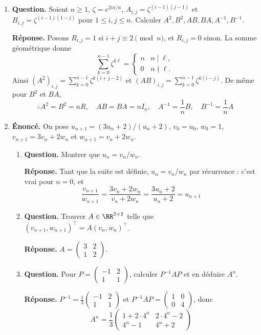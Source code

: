 \documentclass[12pt, a4paper]{article}
\begin{document}
\begin{enumerate}[label=4.\arabic*., start=60]
  \item \begin{minipage}[t]{\linewidth}\raggedright
\textbf{Question.} Soient $n\geq1$, $\zeta=e^{2i\pi/n}$, $A_{i,j}=\zeta^{(i-1)(j-1)}$ et $B_{i,j}=\zeta^{(i-1)(1-j)}$ pour $1\leq i,j\leq n$. Calculer $A^2,B^2,AB,BA,A^{-1},B^{-1}$.
\par\smallskip
\textbf{Réponse.} Posons $R_{i,j}=1$ si $i+j\equiv2\pmod n$, et $R_{i,j}=0$ sinon.
    La somme géométrique donne
    \[
      \sum_{k=0}^{n-1}\zeta^{k\ell}=\begin{cases}n&n\mid\ell,\\0&n\nmid\ell.\end{cases}
    \]
    Ainsi $(A^2)_{i,j}=\sum_{k=0}^{n-1}\zeta^{k(i+j-2)}$ et
    $(AB)_{i,j}=\sum_{k=0}^{n-1}\zeta^{k(i-j)}$.
    De même pour $B^2$ et $BA$,
    \[
      \therefore A^2=B^2=nR,\quad AB=BA=nI_n,\quad A^{-1}=\frac1nB,\quad B^{-1}=\frac1nA
    \]
\end{minipage}

  \item \begin{minipage}[t]{\linewidth}\raggedright
\textbf{Énoncé.} On pose $u_{n+1}=(3u_n+2)/(u_n+2)$, $v_0=u_0$, $w_0=1$, $v_{n+1}=3v_n+2w_n$ et $w_{n+1}=v_n+2w_n$.

\begin{enumerate}[\arabic*.]
        \item \textbf{Question.} Montrer que $u_n=v_n/w_n$.
\par\smallskip
\textbf{Réponse.} Tant que la suite est définie, $u_n=v_n/w_n$ par récurrence : c'est vrai pour $n=0$, et
        \[
          \frac{v_{n+1}}{w_{n+1}}=\frac{3v_n+2w_n}{v_n+2w_n}
          =\frac{3u_n+2}{u_n+2}=u_{n+1}
        \]

  \item \textbf{Question.} Trouver $A\in\RR^{2\times2}$ telle que $(v_{n+1},w_{n+1})^\top=A(v_n,w_n)^\top$.
\par\smallskip
\textbf{Réponse.} $\displaystyle A=\begin{pmatrix}3&2\\1&2\end{pmatrix}$.

  \item \textbf{Question.} Pour $P=\begin{pmatrix}-1&2\\1&1\end{pmatrix}$, calculer $P^{-1}AP$ et en déduire $A^n$.
\par\smallskip
\textbf{Réponse.} $\displaystyle P^{-1}=\frac13\begin{pmatrix}-1&2\\1&1\end{pmatrix}$ et
        $\displaystyle P^{-1}AP=\begin{pmatrix}1&0\\0&4\end{pmatrix}$, donc
        \[
          A^n=\frac13\begin{pmatrix}1+2\cdot4^n&2\cdot4^n-2\\4^n-1&4^n+2\end{pmatrix}
        \]


\end{enumerate}
\end{minipage}
\end{enumerate}
\end{document}
